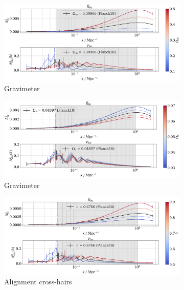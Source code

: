 \documentclass[floats,floatfix,showpacs,amssymb,prd,superscriptaddress,nofootinbib]{revtex4-2} %
\begin{document}
\begin{figure}[H]
     \centering
     \begin{subfigure}[b]{0.9\textwidth}
         \centering
         \includegraphics[width=\textwidth]{images/ic_power_spectra/compare_cosmologies_averaged_power_spectra_Om.png}
         \caption{Gravimeter}
         \label{fig:averaged_IC_power_spectra_Om}
     \end{subfigure}
     \hfill
     \begin{subfigure}[b]{0.9\textwidth}
         \centering
         \includegraphics[width=\textwidth]{images/ic_power_spectra/compare_cosmologies_averaged_power_spectra_Ob.png}
         \caption{Gravimeter}
         \label{fig:averaged_IC_power_spectra_Ob}
     \end{subfigure}
     \hfill
     \begin{subfigure}[b]{0.9\textwidth}
         \centering
         \includegraphics[width=\textwidth]{images/ic_power_spectra/compare_cosmologies_averaged_power_spectra_h.png}
         \caption{Alignment cross-hairs}
         \label{fig:averaged_IC_power_spectra_h}
     \end{subfigure}
        \caption{}
        \label{fig:averaged_IC_power_spectra}
\end{figure}
\end{document}
